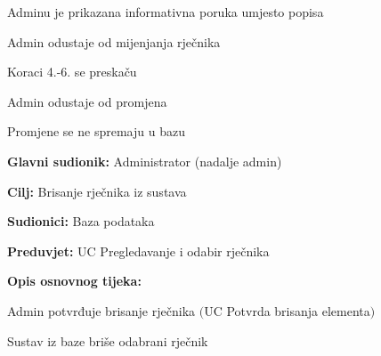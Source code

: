 \begin{packed_item}
\begin{packed_item}
\begin{packed_enum}
			\item Adminu je prikazana informativna poruka umjesto popisa
			\item Admin odustaje od mijenjanja rječnika
			\item Koraci 4.-6. se preskaču
			
		\end{packed_enum}

		\item[5.a] Admin odustaje od promjena
		\item[] \begin{packed_enum}
			
			\item Promjene se ne spremaju u bazu
			
		\end{packed_enum}
		
	\end{packed_item}

\end{packed_item}
					

					\noindent {}
					\begin{packed_item}
	
						\item \textbf{Glavni sudionik:} Administrator (nadalje admin)
						\item  \textbf{Cilj:} Brisanje rječnika iz sustava
						\item  \textbf{Sudionici:} Baza podataka
						\item  \textbf{Preduvjet:} UC Pregledavanje i odabir rječnika
						\item  \textbf{Opis osnovnog tijeka:}
						
						\item[] \begin{packed_enum}
	
							\item Admin potvrđuje brisanje rječnika $($UC Potvrda brisanja elementa$)$
							\item Sustav iz baze briše odabrani rječnik
						\end{packed_enum}
					
					\end{packed_item}

